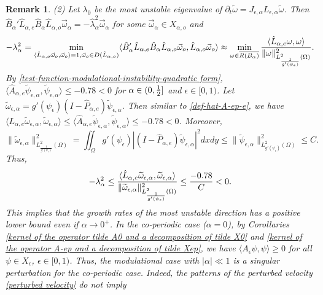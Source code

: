\documentclass[1 [leqno, 11pt]{amsart}
\numberwithin{equation}{section}
\let\ep=\epsilon
\newtheorem{remark}[Theorem]{Remark}
\begin{document}
\begin{CJK*}{GBK}{song}
\begin{remark}
 (2) Let $\lambda_0$ be the most unstable eigenvalue of  $\partial_t \widetilde{\omega} = J_{\ep, \alpha} L_{\ep, \alpha} \widetilde{\omega}$. Then $\hat B_\alpha'\hat L_{\alpha,e}\hat B_\alpha \hat L_{\alpha,o}\vec{\omega}_\alpha=-\hat\lambda_\alpha^2\vec{\omega}_\alpha$ for some $\vec{\omega}_\alpha\in X_{\alpha,o}$ and
 \begin{align*}
 -\lambda_\alpha^2=\min\limits_{\langle \hat L_{\alpha,o}\vec{\omega}_o,\vec{\omega}_o\rangle=1,\vec{\omega}_o\in D( \hat L_{\alpha,o})}\langle\hat B_\alpha'\hat L_{\alpha,e}\hat B_\alpha \hat L_{\alpha,o}\vec{\omega}_o,\hat L_{\alpha,o}\vec{\omega}_o\rangle\approx\min\limits_{ \omega\in \overline{R(B_\alpha)}}{\langle\hat L_{\alpha,e}\omega,\omega\rangle\over \|\omega\|_{L^2_{\frac{1}{g'(\psi_\ep)}}(\Omega)}^2}.
 \end{align*}
By \eqref{test-function-modulational-instability-quadratic form}, $\langle\hat{A}_{\alpha,e} \widetilde\psi_{\ep,\alpha}, \widetilde\psi_{\ep,\alpha} \rangle\leq-0.78<0$   for $\alpha\in(0,{1\over2}]$ and $\ep\in[0,1)$.
Let $\widetilde \omega_{\ep,\alpha}=g'(\psi_\ep)(I - \hat{P}_{\alpha,e})\widetilde\psi_{\ep,\alpha}$. Then similar to \eqref{def-hat-A-ep-e}, we have
$\langle L_{\alpha,e}\widetilde \omega_{\ep,\alpha},\widetilde \omega_{\ep,\alpha}\rangle\leq \langle\hat{A}_{\alpha,e} \widetilde\psi_{\ep,\alpha}, \widetilde\psi_{\ep,\alpha} \rangle\leq-0.78<0$.
Moreover,
$$\|\widetilde \omega_{\ep,\alpha}\|_{L^2_{\frac{1}{g'(\psi_\ep)}}(\Omega)}^2=\iint_{\Omega}g'(\psi_\ep)|(I - \hat{P}_{\alpha,e})\widetilde\psi_{\ep,\alpha}|^2dxdy\leq \|\widetilde\psi_{\ep,\alpha}\|_{L^2_{{g'(\psi_\ep)}}(\Omega)}^2\leq C.$$
 Thus,  \begin{align*}
 -\lambda_\alpha^2\leq {\langle\hat L_{\alpha,e}\widetilde \omega_{\ep,\alpha},\widetilde \omega_{\ep,\alpha}\rangle\over \|\widetilde \omega_{\ep,\alpha}\|_{L^2_{\frac{1}{g'(\psi_\ep)}}(\Omega)}^2}\leq{-0.78\over C}<0.
 \end{align*}
This implies that  the growth rates of the most unstable direction has a positive lower bound even if $\alpha\to0^+$.
In the co-periodic case ($\alpha=0$), by Corollaries \ref{kernel of  the operator tilde A0 and a decomposition of tilde X0} and \ref{kernel of  the operator A-ep and a decomposition of tilde Xep}, we have $\langle A_\ep \psi,\psi\rangle\geq 0$ for all $\psi\in X_\ep$, $\ep\in[0,1)$.
Thus, the modulational case with $|\alpha|\ll1$ is a singular perturbation for the co-periodic case. Indeed,  the patterns  of the perturbed velocity  \eqref{perturbed  velocity} do not imply

\end{remark}
\end{CJK*}
\end{document}
